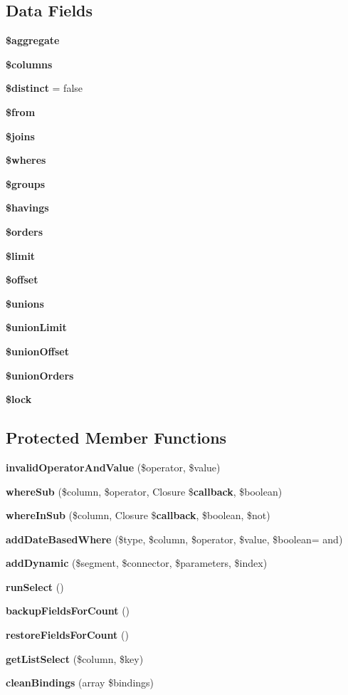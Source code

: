 \subsection*{Data Fields}
\begin{DoxyCompactItemize}
\item 
{\bf \$aggregate}
\item 
{\bf \$columns}
\item 
{\bf \$distinct} = false
\item 
{\bf \$from}
\item 
{\bf \$joins}
\item 
{\bf \$wheres}
\item 
{\bf \$groups}
\item 
{\bf \$havings}
\item 
{\bf \$orders}
\item 
{\bf \$limit}
\item 
{\bf \$offset}
\item 
{\bf \$unions}
\item 
{\bf \$union\+Limit}
\item 
{\bf \$union\+Offset}
\item 
{\bf \$union\+Orders}
\item 
{\bf \$lock}
\end{DoxyCompactItemize}
\subsection*{Protected Member Functions}
\begin{DoxyCompactItemize}
\item 
{\bf invalid\+Operator\+And\+Value} (\$operator, \$value)
\item 
{\bf where\+Sub} (\$column, \$operator, Closure \${\bf callback}, \$boolean)
\item 
{\bf where\+In\+Sub} (\$column, Closure \${\bf callback}, \$boolean, \$not)
\item 
{\bf add\+Date\+Based\+Where} (\$type, \$column, \$operator, \$value, \$boolean= \textquotesingle{}and\textquotesingle{})
\item 
{\bf add\+Dynamic} (\$segment, \$connector, \$parameters, \$index)
\item 
{\bf run\+Select} ()
\item 
{\bf backup\+Fields\+For\+Count} ()
\item 
{\bf restore\+Fields\+For\+Count} ()
\item 
{\bf get\+List\+Select} (\$column, \$key)
\item 
{\bf clean\+Bindings} (array \$bindings)
\end{DoxyCompactItemize}
